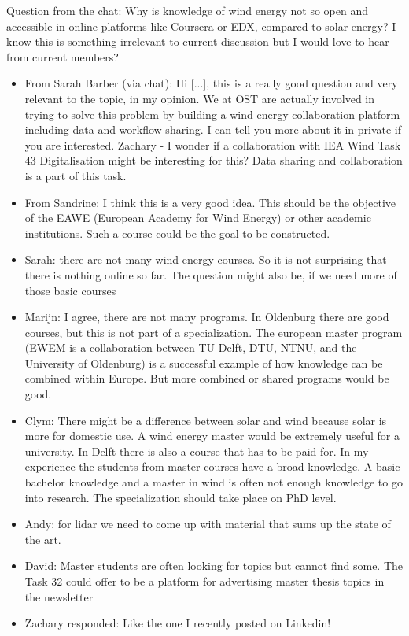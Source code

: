 Question from the chat: Why is knowledge of wind energy not so open and
accessible in online platforms like Coursera or EDX, compared to solar
energy? I know this is something irrelevant to current discussion but I
would love to hear from current members?

\begin{itemize}
	\item From Sarah Barber (via chat): Hi {[}...{]}, this is a really good
	      question and very relevant to the topic, in my opinion. We at OST are
	      actually involved in trying to solve this problem by building a wind
	      energy collaboration platform including data and workflow sharing. I
	      can tell you more about it in private if you are interested. Zachary -
	      I wonder if a collaboration with IEA Wind Task 43 Digitalisation might
	      be interesting for this? Data sharing and collaboration is a part of
	      this task.
	\item From Sandrine: I think this is a very good idea. This should be the
	      objective of the EAWE (European Academy for Wind Energy) or other
	      academic institutions. Such a course could be the goal to be
	      constructed.
	\item Sarah: there are not many wind energy courses. So it is not surprising
	      that there is nothing online so far. The question might also be, if we
	      need more of those basic courses
	\item Marijn: I agree, there are not many programs. In Oldenburg there are
	      good courses, but this is not part of a specialization. The european
	      master program (EWEM is a collaboration between TU Delft, DTU, NTNU,
	      and the University of Oldenburg) is a successful example of how
	      knowledge can be combined within Europe. But more combined or shared
	      programs would be good.
	\item Clym: There might be a difference between solar and wind because solar is more for domestic use. A wind energy master would be extremely useful for a university. In Delft there is also a course that has to
	      be paid for. In my experience the students from master courses have a
	      broad knowledge. A basic bachelor knowledge and a master in wind is
	      often not enough knowledge to go into research. The specialization
	      should take place on PhD level.
	\item Andy: for lidar we need to come up with material that sums up the state of the art.
	\item David: Master students are often looking for topics but cannot find some. The Task 32 could offer to be a platform for advertising master thesis topics in the newsletter
	\item Zachary responded: Like the one I recently posted on Linkedin!
\end{itemize}

